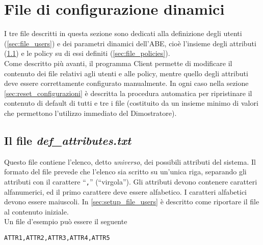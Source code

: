 \documentclass[a4paper,twoside,10pt,openany]{scrbook}
\begin{document}
\section{File di configurazione dinamici}\label{sec:file_config_dinamici}
I tre file descritti in questa sezione sono dedicati alla definizione degli utenti (\ref{sec:file_users}) e dei parametri dinamici dell'\ac{ABE}, cioè l'insieme degli attributi (\ref{sec:file_attributes}) e le policy su di essi definiti (\ref{sec:file_policies}).\\
Come descritto più avanti, il programma Client permette di modificare il contenuto dei file relativi agli utenti e alle policy, mentre quello degli attributi deve essere correttamente configurato manualmente. In ogni caso nella sezione \ref{sec:reset_configurazioni} è descritta la procedura automatica per ripristinare il contenuto di default di tutti e tre i file (costituito da un insieme minimo di valori che permettono l'utilizzo immediato del Dimostratore).
%
\subsection{Il file \emph{def\_attributes.txt}}\label{sec:file_attributes}
Questo file contiene l'elenco, detto \emph{universo}, dei possibili attributi del sistema. Il formato del file prevede che l'elenco sia scritto su un'unica riga, separando gli attributi con il carattere ``\texttt{,}'' (``virgola''). Gli attributi devono contenere caratteri alfanumerici, ed il primo carattere deve essere alfabetico. I caratteri alfabetici devono essere maiuscoli. In \ref{sec:setup_file_users} è descritto come riportare il file al contenuto iniziale.\\
Un file d'esempio può essere il seguente
\begin{verbatim}
ATTR1,ATTR2,ATTR3,ATTR4,ATTR5
\end{verbatim}
%
\end{document}
